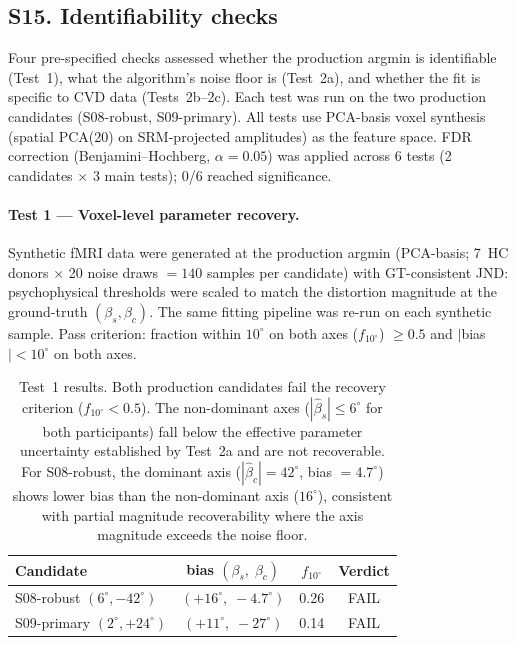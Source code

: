 
\subsection*{\textbf{S15. Identifiability checks}}
\label{app:identifiability}

Four pre-specified checks assessed whether the production argmin
is identifiable (Test~1), what the algorithm's noise floor is
(Test~2a), and whether the fit is specific to CVD data
(Tests~2b--2c).
Each test was run on the two production candidates (S08-robust,
S09-primary).
All tests use PCA-basis voxel synthesis (spatial PCA(20) on
SRM-projected amplitudes) as the feature space.
FDR correction (Benjamini--Hochberg, $\alpha = 0.05$) was applied
across 6 tests (2 candidates $\times$ 3 main tests); 0/6 reached
significance.

\paragraph{Test 1 — Voxel-level parameter recovery.}

Synthetic fMRI data were generated at the production argmin
(PCA-basis; 7~HC donors $\times$ 20 noise draws $= 140$ samples
per candidate) with GT-consistent JND: psychophysical thresholds were
scaled to match the distortion magnitude at the ground-truth
$(\beta_s, \beta_c)$.
The same fitting pipeline was re-run on each synthetic sample.
Pass criterion: fraction within $10^\circ$ on both axes
($f_{10^\circ}$) $\geq 0.5$ and $|$bias$| < 10^\circ$ on both axes.

\begin{table}[h]
\centering
\begin{tabular}{lccc}
\hline
Candidate & bias $(\beta_s,\; \beta_c)$ & $f_{10^\circ}$ & Verdict \\
\hline
S08-robust  $(6^\circ, -42^\circ)$  & $(+16^\circ,\; -4.7^\circ)$  & 0.26 & FAIL \\
S09-primary $(2^\circ, +24^\circ)$  & $(+11^\circ,\; -27^\circ)$  & 0.14 & FAIL \\
\hline
\end{tabular}
\caption{Test~1 results. Both production candidates fail the recovery
criterion ($f_{10^\circ} < 0.5$).
The non-dominant axes ($|\hat\beta_s| \leq 6^\circ$ for both
participants) fall below the effective parameter uncertainty
established by Test~2a and are not recoverable.
For S08-robust, the dominant axis ($|\hat\beta_c| = 42^\circ$, bias
$= 4.7^\circ$) shows lower bias than the non-dominant axis
($16^\circ$), consistent with partial magnitude recoverability
where the axis magnitude exceeds the noise floor.}
\end{table}

